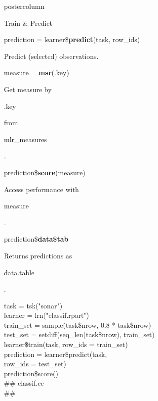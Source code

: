 \documentclass{beamer}
\newcommand{\codeinline}[1]{\begin{codeboxinline}#1\end{codeboxinline}}
\begin{document}
\begin{frame}[fragile]{}
\begin{columns}
\begin{column}{.245\textwidth}
\begin{beamercolorbox}[center]{postercolumn}
\begin{minipage}{.98\textwidth}
{\begin{myblock}{Train \& Predict}
						\vspace{1em} %
						\begin{codebox}
							prediction = learner\$\textbf{predict}(task, row\_ids)
						\end{codebox}
                        Predict (selected) observations.
						\\
						\begin{codebox}
							measure = \textbf{msr}(.key)
						\end{codebox}
						Get measure by \codeinline{.key} from \codeinline{mlr\_measures}.
						\\
						\begin{codebox}
							prediction\$\textbf{score}(measure)
						\end{codebox}
						Access performance with \codeinline{measure}.
						\\
						\begin{codebox}
							prediction\$\textbf{data\$tab}
						\end{codebox}
						Returns predictions as \codeinline{data.table}.
						\\
						\begin{codeboxexample}
						{\footnotesize
							task = tsk("sonar")\\
							learner = lrn("classif.rpart")
							\vspace{1em}
							\\
							train\_set = sample(task\$nrow, 0.8 * task\$nrow)\\
							test\_set = setdiff(seq\_len(task\$nrow), train\_set)
							\vspace{1em}
							\\
							learner\$train(task, row\_ids = train\_set)
							\vspace{1em}
							\\
							prediction = learner\$predict(task,\\
							\hspace*{1ex} row\_ids = test\_set)\\
							prediction\$score()\\
							\#\# classif.ce\\
							\#\# }
					\end{codeboxexample}
					\end{myblock}
					\vfill
					}
				\end{minipage}
			\end{beamercolorbox}
		\end{column}
	\end{columns}
\end{frame}
\end{document}
